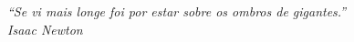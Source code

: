 \begin{epigrafe}

%
%

\vspace*{\fill} 
\begin{flushright}
\textit{``Se vi mais longe foi por estar sobre os ombros de gigantes.''\\ Isaac Newton}

\end{flushright}
\end{epigrafe}

